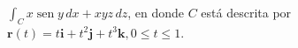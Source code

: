 \item $\int_C x \operatorname{sen} y \, dx + xyz \, dz$, en donde $C$ está descrita por $\mathbf{r}(t) = t\mathbf{i} + t^2\mathbf{j} + t^3\mathbf{k}, 0 \le t \le 1$.

